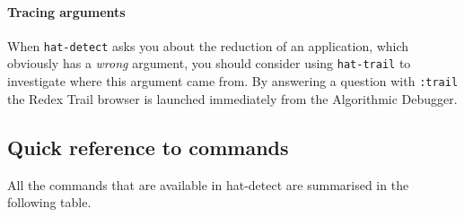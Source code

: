\documentclass[12pt]{article}
\begin{document}


\paragraph{Tracing arguments}

When \texttt{hat-detect} asks you about the reduction of an
application, which obviously has a \emph{wrong} argument, you should
consider using \texttt{hat-trail} to investigate where this argument
came from.  By answering a question with \texttt{:trail} the Redex
Trail browser is launched immediately from the Algorithmic Debugger.

\subsection{Quick reference to commands}

All the commands that are available in hat-detect are summarised in
the following table.
\end{document}
